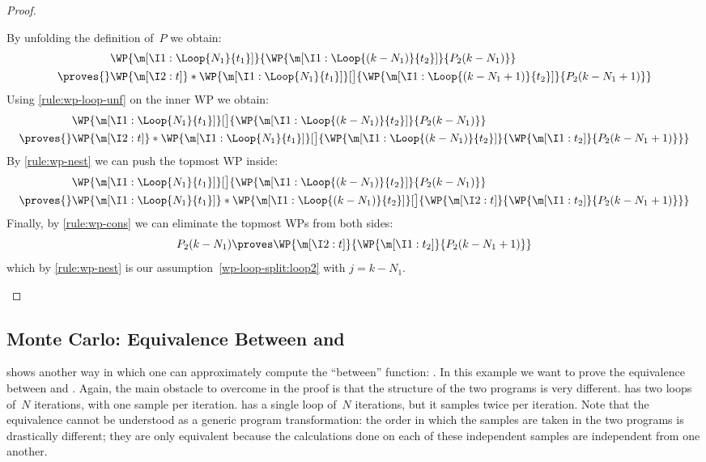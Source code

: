 \begin{proof}
\begin{casesplit}
  \case[$k>N_1$] By unfolding the definition of~$P$ we obtain:
    \begin{align*}
      &\WP {\m[\I1: \Loop{N_1}{t_1}]}{
        \WP {\m[\I1: \Loop{(k-N_1)}{t_2}]} { P_2(k-N_1) }
      }
      \\ {}\proves{}&
      \WP {\m[\I2: t]}*{
        \WP {\m[\I1: \Loop{N_1}{t_1}]}[\big]{
          \WP {\m[\I1: \Loop{(k-N_1+1)}{t_2}]} { P_2(k-N_1+1) }
        }
      }
    \end{align*}
    Using \ref{rule:wp-loop-unf} on the inner WP we obtain:
    \begin{align*}
      &\WP {\m[\I1: \Loop{N_1}{t_1}]}[\big]{
        \WP {\m[\I1: \Loop{(k-N_1)}{t_2}]} { P_2(k-N_1) }
      }
      \\ {}\proves{}&
      \WP {\m[\I2: t]}*{
        \WP {\m[\I1: \Loop{N_1}{t_1}]}[\big]{
          \WP {\m[\I1: \Loop{(k-N_1)}{t_2}]} {
            \WP{\m[\I1: t_2]}{P_2(k-N_1+1)}
          }
        }
      }
    \end{align*}
    By \ref{rule:wp-nest} we can push the topmost WP inside:
    \begin{align*}
      &\WP {\m[\I1: \Loop{N_1}{t_1}]}[\big]{
        \WP {\m[\I1: \Loop{(k-N_1)}{t_2}]} { P_2(k-N_1) }
      }
      \\ {}\proves{}&
      \WP {\m[\I1: \Loop{N_1}{t_1}]}*{
        \WP {\m[\I1: \Loop{(k-N_1)}{t_2}]}[\big]{
          \WP {\m[\I2: t]} {
            \WP{\m[\I1: t_2]}{P_2(k-N_1+1)}
          }
        }
      }
    \end{align*}
    Finally, by \ref{rule:wp-cons} we can eliminate the topmost WPs from both sides:
    \begin{equation*}
    P_2(k-N_1)
    \proves
    \WP {\m[\I2: t]} {
      \WP{\m[\I1: t_2]}{P_2(k-N_1+1)}
    }
    \end{equation*}
    which by \ref{rule:wp-nest} is our assumption~\eqref{wp-loop-split:loop2}
    with $j=k-N_1$.
  \qedhere
  \end{casesplit}
\end{proof}  

\subsection{Monte Carlo: Equivalence Between  and }

   shows another way in which one can
approximately compute the ``between'' function: .
In this example we want to prove the equivalence between
 and .
Again, the main obstacle to overcome in the proof is that
the structure of the two programs is very different.
 has two loops of~$N$ iterations, with one sample per iteration.
 has a single loop of~$N$ iterations, but it samples twice
per iteration.
Note that the equivalence cannot be understood as a generic program transformation: the order in which the samples are taken in the two programs
is drastically different; they are only equivalent because the calculations
done on each of these independent samples are independent from one another.

